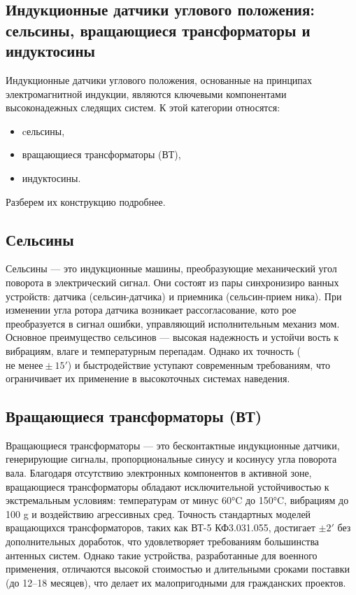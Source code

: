 \subsection{Индукционные датчики углового положения: сельсины, вращающиеся трансформаторы и индуктосины}

Индукционные датчики углового положения, основанные на принципах электромагнитной индукции, являются ключевыми компонентами высоконадежных следящих систем. 
К этой категории относятся: 
\begin{itemize} 
  \item cельсины, 
  \item вращающиеся трансформаторы (ВТ), 
  \item индуктосины. 
\end{itemize}

Разберем их конструкцию подробнее.

\subsection{Сельсины}
Сельсины — это индукционные машины, преобразующие механический
угол поворота в электрический сигнал. Они состоят из пары синхронизиро­
ванных устройств: датчика (сельсин-датчика) и приемника (сельсин-прием­
ника). При изменении угла ротора датчика возникает рассогласование, кото­
рое преобразуется в сигнал ошибки, управляющий исполнительным механиз­
мом. Основное преимущество сельсинов — высокая надежность и устойчи­
вость к вибрациям, влаге и температурным перепадам. Однако их точность ($ \text{не менее}\pm15'$) 
и быстродействие уступают современным требованиям, что ограничивает их применение в высокоточных системах наведения.

\subsection{Вращающиеся трансформаторы (ВТ)}

Вращающиеся трансформаторы — это бесконтактные индукционные датчики, генерирующие сигналы, пропорциональные синусу и косинусу угла поворота вала. 
Благодаря отсутствию электронных компонентов в активной зоне, вращающиеся трансформаторы обладают исключительной устойчивостью к экстремальным условиям: 
температурам от минус 60°C до 150°C, 
вибрациям до 100 g и воздействию агрессивных сред.
Точность стандартных моделей вращающихся трансформаторов, таких как ВТ-5 КФ3.031.055, достигает $ \pm 2'$ без дополнительных доработок, 
что удовлетворяет требованиям большинства антенных систем. 
Однако такие устройства, разработанные для военного применения, отличаются высокой стоимостью и длительными сроками поставки (до 12–18 месяцев), 
что делает их малопригодными для гражданских проектов.

